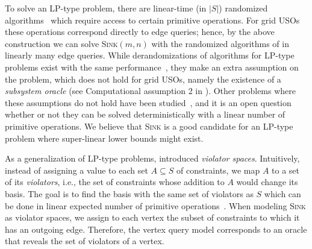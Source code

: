 \documentclass[runningheads,a4paper]{llncs}
\newcommand{\sink}{\textsc{Sink}\xspace}
\newcommand{\sinkmn}{\textsc{Sink}$(m,n)$\xspace}
\begin{document}
To solve an LP-type problem, there are linear-time (in $|S|$) randomized algorithms~\cite{MatousekSW96} which require access to certain primitive operations.
For grid USOs these operations correspond directly to edge queries; 
hence, by the above construction we can solve \sinkmn with the randomized algorithms of \cite{MatousekSW96} in linearly many edge queries.
While derandomizations of algorithms for LP-type problems exist with the same performance~\cite{chan16,ChazelleM96}, they make an extra assumption on the problem, which does not hold for grid USOs, namely the existence of a \emph{subsystem oracle} (see Computational assumption 2 in \cite{ChazelleM96}).
Other problems where these assumptions do not hold have been studied~\cite{chan1998deterministic}, and it is an open question whether or not 
they can be solved deterministically with a linear number of primitive operations.
We believe that \sink is a good candidate for an LP-type problem where super-linear lower bounds might exist. 

As a generalization of LP-type problems, \citet{DBLP:journals/dam/GartnerMRS08} introduced \emph{violator  spaces}. 
Intuitively, instead of assigning a value to each set $A\subseteq S$ of constraints, %
we map $A$ to a set of its \emph{violators}, i.e., the set of constraints whose addition to $A$ would change its basis. The goal is to find the basis with the same set of violators as $S$ which can be done in linear expected number of primitive operations~\cite{DBLP:journals/dam/GartnerMRS08}.
When modeling \sink as violator spaces, we assign to each vertex the subset of constraints to which it has an outgoing edge.
Therefore, the vertex query model corresponds to an oracle that reveals the set of violators of a vertex.
\end{document}
